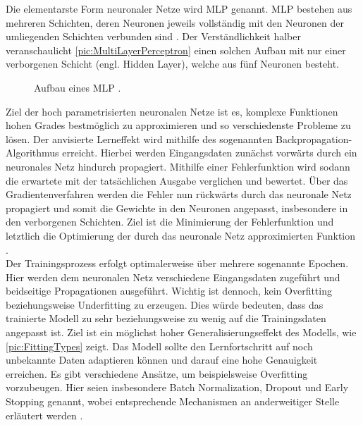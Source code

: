 \noindent
Die elementarste Form neuronaler Netze wird \ac{MLP} genannt. \ac{MLP} bestehen aus mehreren Schichten, deren Neuronen jeweils vollständig mit den Neuronen der umliegenden Schichten verbunden sind \cite[S.~131]{ZHA20}. Der Verständlichkeit halber veranschaulicht \autoref{pic:MultiLayerPerceptron} einen solchen Aufbau mit nur einer verborgenen Schicht (engl. Hidden Layer), welche aus fünf Neuronen besteht.\\

\begin{figure}[h!]
  \centering
  \caption{Aufbau eines MLP \cite[S.~133]{ZHA20}.}
  \label{pic:MultiLayerPerceptron}
\end{figure}

\noindent
Ziel der hoch parametrisierten neuronalen Netze ist es, komplexe Funktionen hohen Grades bestmöglich zu approximieren und so verschiedenste Probleme zu lösen. Der anvisierte Lerneffekt wird mithilfe des sogenannten Backpropagation-Algorithmus erreicht. Hierbei werden Eingangsdaten zunächst vorwärts durch ein neuronales Netz hindurch propagiert. Mithilfe einer Fehlerfunktion wird sodann die erwartete mit der tatsächlichen Ausgabe verglichen und bewertet. Über das Gradientenverfahren werden die Fehler nun rückwärts durch das neuronale Netz propagiert und somit die Gewichte in den Neuronen angepasst, insbesondere in den verborgenen Schichten. Ziel ist die Minimierung der Fehlerfunktion und letztlich die Optimierung der durch das neuronale Netz approximierten Funktion \cite[S.~140, 169]{ZHA20}.\\

\noindent
Der Trainingsprozess erfolgt optimalerweise über mehrere sogenannte Epochen. Hier werden dem neuronalen Netz verschiedene Eingangsdaten zugeführt und beidseitige Propagationen ausgeführt. Wichtig ist dennoch, kein Overfitting beziehungsweise Underfitting zu erzeugen. Dies würde bedeuten, dass das trainierte Modell zu sehr beziehungsweise zu wenig auf die Trainingsdaten angepasst ist. Ziel ist ein möglichst hoher Generalisierungseffekt des Modells, wie \autoref{pic:FittingTypes} zeigt. Das Modell sollte den Lernfortschritt auf noch unbekannte Daten adaptieren können und darauf eine hohe Genauigkeit erreichen. Es gibt verschiedene Ansätze, um beispielsweise Overfitting vorzubeugen. Hier seien insbesondere Batch Normalization, Dropout und Early Stopping genannt, wobei entsprechende Mechanismen an anderweitiger Stelle erläutert werden \cite[S.~143-149]{ZHA20}.\\

